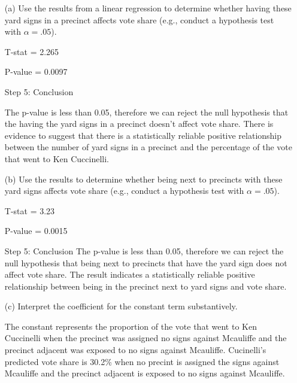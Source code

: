 \documentclass[12pt,letterpaper]{article}
\begin{document}
\vspace{.5cm}
\begin{enumerate}
	\item [(a)] Use the results from a linear regression to determine whether having these yard signs in a precinct affects vote share (e.g., conduct a hypothesis test with $\alpha = .05$).
	
	
	
	\noindent
	T-stat = 2.265
	
	P-value = 0.0097
	
	\vspace*{0.5cm}
	Step 5: Conclusion 
	
	The p-value is less than 0.05, therefore we can reject the null hypothesis that the having the yard signs in a precinct doesn't affect vote share. There is evidence to suggest that there is a statistically reliable positive relationship between the number of yard signs in a precinct and the percentage of the vote that went to Ken Cuccinelli.
	
	
	\vspace*{2cm}		
	\item [(b)]  Use the results to determine whether being
	next to precincts with these yard signs affects vote
	share (e.g., conduct a hypothesis test with $\alpha = .05$).
	
	
	
	T-stat = 3.23
	
	P-value = 0.0015
	
	\vspace*{0.5cm}
	Step 5: Conclusion
	The p-value is less than 0.05, therefore we can reject the null hypothesis that being next to precincts that have the yard sign does not affect vote share. The result indicates a statistically reliable positive relationship between being in the precinct next to yard signs and vote share.
	
	\vspace{7cm}
	\item [(c)] Interpret the coefficient for the constant term substantively.
	
	\vspace*{0.5cm}
	\noindent
	The constant represents the proportion of the vote that went to Ken Cuccinelli  when the precinct was assigned no signs against Mcauliffe and the precinct adjacent was exposed to no signs against Mcauliffe. Cucinelli's predicted vote share is 30.2\% when no precint is assigned the signs against Mcauliffe and the precinct adjacent is exposed to no signs against Mcauliffe.
	\vspace{2cm}
	

\end{enumerate}
\end{document}
